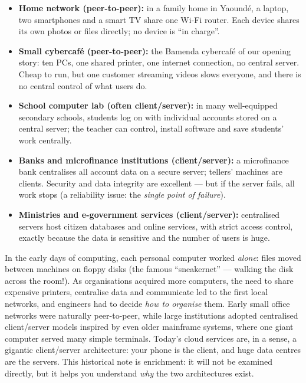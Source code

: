 \documentclass[11pt]{article}
\begin{document}
\begin{exemplebox}
\begin{itemize}
\item \textbf{Home network (peer-to-peer):} in a family home in Yaoundé, a laptop, two smartphones and a smart TV share one Wi-Fi router. Each device shares its own photos or files directly; no device is ``in charge''.
\item \textbf{Small cybercafé (peer-to-peer):} the Bamenda cybercafé of our opening story: ten PCs, one shared printer, one internet connection, no central server. Cheap to run, but one customer streaming videos slows everyone, and there is no central control of what users do.
\item \textbf{School computer lab (often client/server):} in many well-equipped secondary schools, students log on with individual accounts stored on a central server; the teacher can control, install software and save students' work centrally.
\item \textbf{Banks and microfinance institutions (client/server):} a microfinance bank centralises all account data on a secure server; tellers' machines are clients. Security and data integrity are excellent --- but if the server fails, all work stops (a reliability issue: the \emph{single point of failure}).
\item \textbf{Ministries and e-government services (client/server):} centralised servers host citizen databases and online services, with strict access control, exactly because the data is sensitive and the number of users is huge.
\end{itemize}
\end{exemplebox}

\begin{savaistu}
In the early days of computing, each personal computer worked \emph{alone}: files moved between machines on floppy disks (the famous ``sneakernet'' --- walking the disk across the room!). As organisations acquired more computers, the need to share expensive printers, centralise data and communicate led to the first local networks, and engineers had to decide \emph{how to organise} them. Early small office networks were naturally peer-to-peer, while large institutions adopted centralised client/server models inspired by even older mainframe systems, where one giant computer served many simple terminals. Today's cloud services are, in a sense, a gigantic client/server architecture: your phone is the client, and huge data centres are the servers. This historical note is enrichment: it will not be examined directly, but it helps you understand \emph{why} the two architectures exist.
\end{savaistu}
\end{document}
